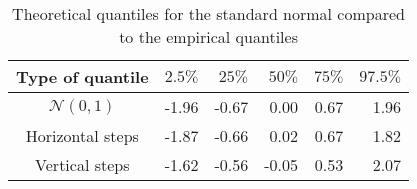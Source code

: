 \begin{table}[h]
    \centering
    \begin{tabular}{crrrrr}
      \hline
     Type of quantile & $2.5\%$ & $25\%$ & $50\%$ & $75\%$ & $97.5\%$ \\ 
     \hline
     $\mathcal{N}(0,1)$ & -1.96 & -0.67 & 0.00 & 0.67 & 1.96 \\ 
     Horizontal steps & -1.87 & -0.66 & 0.02 & 0.67 & 1.82 \\ 
     Vertical steps & -1.62 & -0.56 & -0.05 & 0.53 & 2.07 \\ 
        \hline
    \end{tabular}
    \caption{Theoretical quantiles for the standard normal compared to the empirical quantiles}
\end{table}
